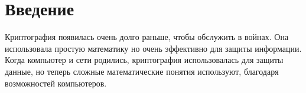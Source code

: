 \section{Введение}
Криптография появилась очень долго раньше, чтобы обслужить в войнах. Она использовала простую математику но очень эффективно для защиты информации. Когда компьютер и сети родились, криптография использовалась для защиты данные, но теперь сложные математические понятия используют, благодаря возможностей компьютеров.